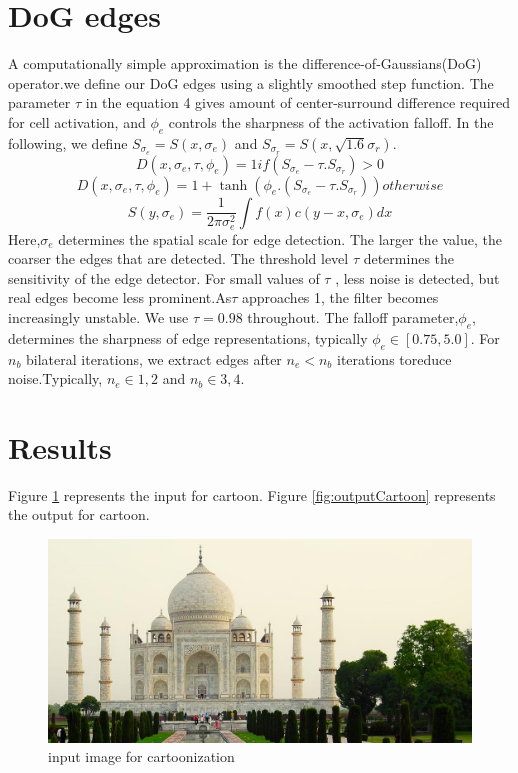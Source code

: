 \documentclass[conference]{IEEEtran}
\begin{document}
 \section{DoG edges}
 	A computationally simple approximation is the difference-of-Gaussians(DoG) operator.we define our DoG edges using a slightly smoothed step function. The parameter $\tau$ in the equation 4 gives amount of center-surround difference required for cell activation, and $\phi_e$ controls the sharpness of the activation falloff. In the following, we define $S_{\sigma_e} = S(x,\sigma_e)$ and $S_{\sigma_r} = S(x,\sqrt{1.6}\sigma_r)$.
 	$$D(x,\sigma_e,\tau,\phi_e) = 1  if   (S_{\sigma_e}-\tau.S_{\sigma_r}) > 0$$
 	$$D(x,\sigma_e,\tau,\phi_e) = 1+\tanh(\phi_e.(S_{\sigma_e}-\tau.S_{\sigma_r}))  otherwise$$
 	$$S(y,\sigma_e) = \frac{1}{2\pi\sigma_e^2}\int f(x)c(y-x,\sigma_e) dx $$
 	Here,$\sigma_e$ determines the spatial scale for edge detection. The larger the value, the coarser the edges that are detected. The threshold level $\tau$ determines the sensitivity of the edge detector. For small values of $\tau$ , less noise is detected, but real edges become less prominent.As$\tau$ approaches 1, the filter becomes increasingly unstable. We use $\tau=0.98$ throughout.  The falloff parameter,$\phi_e$, determines the sharpness of edge representations, typically $\phi_e \in [0.75,5.0]$. For $n_b$ bilateral iterations, we extract edges after $n_e<n_b$ iterations toreduce noise.Typically, $n_e \in {1,2}$ and $n_b \in {3,4}$.
 
 \section{Results}
 Figure \ref{fig:inputCartoon} represents the input for cartoon.
 Figure \ref{fig:outputCartoon} represents the output for cartoon.
 
 \begin{figure}
 	\includegraphics[width = \linewidth]{taj.jpg}
 	\caption{input image for cartoonization}
 	\label{fig:inputCartoon}
 \end{figure}
\end{document}
